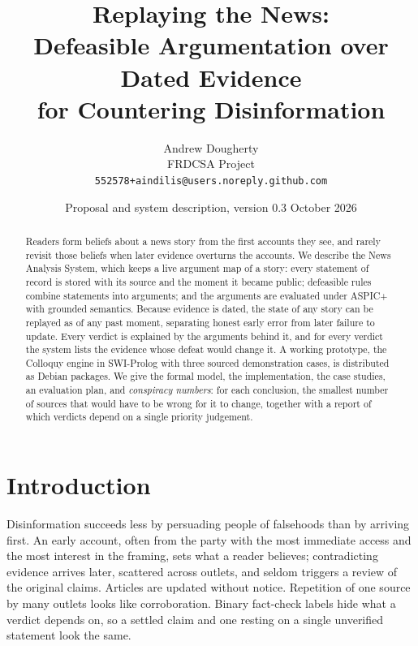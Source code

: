 \documentclass[11pt]{article}
\title{Replaying the News:\\
Defeasible Argumentation over Dated Evidence\\
for Countering Disinformation}
\author{Andrew Dougherty\\
\small FRDCSA Project\\
\small\texttt{552578+aindilis@users.noreply.github.com}}
\date{Proposal and system description, version 0.3 \quad 14 October 2026}
\begin{document}
\maketitle

\begin{center}
\end{center}

\begin{abstract}
Readers form beliefs about a news story from the first accounts they see,
and rarely revisit those beliefs when later evidence overturns the
accounts. We describe the News Analysis System, which keeps a live
argument map of a story: every statement of record is stored with its
source and the moment it became public; defeasible rules combine
statements into arguments; and the arguments are evaluated under ASPIC+
with grounded semantics. Because evidence is dated, the state of any
story can be replayed as of any past moment, separating honest early
error from later failure to update. Every verdict is explained by the
arguments behind it, and for every verdict the system lists the evidence
whose defeat would change it. A working prototype, the Colloquy engine in
SWI-Prolog with three sourced demonstration cases, is distributed as
Debian packages. We give the formal model, the implementation, the case
studies, an evaluation plan, and \emph{conspiracy numbers}: for each
conclusion, the smallest number of sources that would have to be wrong
for it to change, together with a report of which verdicts depend on a
single priority judgement.
\end{abstract}

\section{Introduction}

Disinformation succeeds less by persuading people of falsehoods than by
arriving first. An early account, often from the party with the most
immediate access and the most interest in the framing, sets what a
reader believes; contradicting evidence arrives later, scattered across
outlets, and seldom triggers a review of the original claims. Articles
are updated without notice. Repetition of one source by many outlets
looks like corroboration. Binary fact-check labels hide what a verdict
depends on, so a settled claim and one resting on a single unverified
statement look the same.
\end{document}
